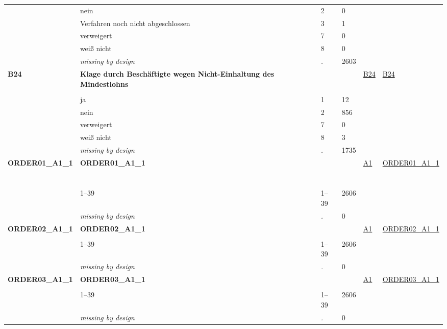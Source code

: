 \begin{longtable}{| L{2.45cm} | L{6cm} | C{1.5cm} | R{1cm} | C{2.25cm} | C{2.25cm} |}
   & nein & 2 & 0 &  &  \\ 
   & Verfahren noch nicht abgeschlossen & 3 & 1 &  &  \\ 
   & verweigert & 7 & 0 &  &  \\ 
   & weiß nicht & 8 & 0 &  &  \\ 
   & \textit{missing by design} & \textit{.} & 2603 &  &  \\ 
   \midrule
\textbf{B24}\label{var:B24} & \textbf{Klage durch Beschäftigte wegen Nicht-Einhaltung des Mindestlohns} &  &  & \hyperref[B24]{B24} & \hyperref[var:suf:B24]{B24} \\ 
   &  &  &  &  &  \\ 
   & ja & 1 & 12 &  &  \\ 
   & nein & 2 & 856 &  &  \\ 
   & verweigert & 7 & 0 &  &  \\ 
   & weiß nicht & 8 & 3 &  &  \\ 
   & \textit{missing by design} & \textit{.} & 1735 &  &  \\ 
   \midrule
\textbf{ORDER01\_A1\_1}\label{var:ORDER01:A1:1} & \textbf{ORDER01\_A1\_1} &  &  & \hyperref[A1]{A1} & \hyperref[var:suf:ORDER01:A1:1]{ORDER01\_A1\_1} \\ 
   & \protect\subsection[Variablen ORDER01\_A1\_1 bis ORDER39\_A1\_1]{} &  &  &  &  \\ 
   & 1--39 & 1--39 & 2606 &  &  \\ 
   & \textit{missing by design} & \textit{.} & 0 &  &  \\ 
   \midrule
\textbf{ORDER02\_A1\_1}\label{var:ORDER02:A1:1} & \textbf{ORDER02\_A1\_1} &  &  & \hyperref[A1]{A1} & \hyperref[var:suf:ORDER02:A1:1]{ORDER02\_A1\_1} \\ 
   &  &  &  &  &  \\ 
   & 1--39 & 1--39 & 2606 &  &  \\ 
   & \textit{missing by design} & \textit{.} & 0 &  &  \\ 
   \midrule
\textbf{ORDER03\_A1\_1}\label{var:ORDER03:A1:1} & \textbf{ORDER03\_A1\_1} &  &  & \hyperref[A1]{A1} & \hyperref[var:suf:ORDER03:A1:1]{ORDER03\_A1\_1} \\ 
   &  &  &  &  &  \\ 
   & 1--39 & 1--39 & 2606 &  &  \\ 
   & \textit{missing by design} & \textit{.} & 0 &  &  \\ 

\end{longtable}

